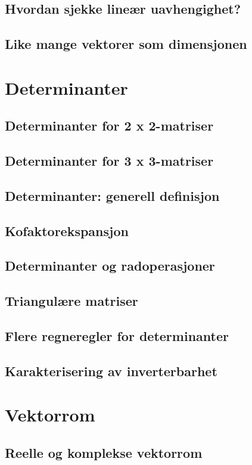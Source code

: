 \documentclass{article}
\begin{document}
\subsection{Hvordan sjekke lineær uavhengighet?}
\subsection{Like mange vektorer som dimensjonen}


\section{Determinanter}

\subsection{Determinanter for 2 x 2-matriser}
\subsection{Determinanter for 3 x 3-matriser}
\subsection{Determinanter: generell definisjon}
\subsection{Kofaktorekspansjon}
\subsection{Determinanter og radoperasjoner}
\subsection{Triangulære matriser}
\subsection{Flere regneregler for determinanter}
\subsection{Karakterisering av inverterbarhet}


\section{Vektorrom}

\subsection{Reelle og komplekse vektorrom}
\end{document}
